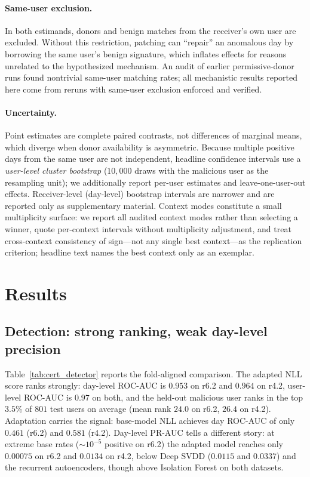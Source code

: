 \documentclass[10pt]{article} %
\newcommand{\rsix}{r6.2}
\newcommand{\rfour}{r4.2}
\begin{document}
\paragraph{Same-user exclusion.}
In both estimands, donors and benign matches from the receiver's own user are
excluded. Without this restriction, patching can ``repair'' an anomalous day by
borrowing the same user's benign signature, which inflates effects for reasons
unrelated to the hypothesized mechanism. An audit of earlier permissive-donor
runs found nontrivial same-user matching rates; all mechanistic results
reported here come from reruns with same-user exclusion enforced and verified.

\paragraph{Uncertainty.}
Point estimates are complete paired contrasts, not differences of marginal
means, which diverge when donor availability is asymmetric. Because multiple
positive days from the same user are not independent, headline confidence
intervals use a \emph{user-level cluster bootstrap} ($10{,}000$ draws with the
malicious user as the resampling unit); we additionally report per-user
estimates and leave-one-user-out effects. Receiver-level (day-level) bootstrap
intervals are narrower and are reported only as supplementary material.
Context modes constitute a small multiplicity surface: we report all audited
context modes rather than selecting a winner, quote per-context intervals
without multiplicity adjustment, and treat cross-context consistency of
sign---not any single best context---as the replication criterion; headline
text names the best context only as an exemplar.

\section{Results}
\label{sec:results}

\subsection{Detection: strong ranking, weak day-level precision}
\label{sec:detresults}

Table~\ref{tab:cert_detector} reports the fold-aligned comparison. The adapted
NLL score ranks strongly: day-level ROC-AUC is $0.953$ on \rsix{} and $0.964$
on \rfour{}, user-level ROC-AUC is $0.97$ on both, and the held-out malicious
user ranks in the top $3.5\%$ of $801$ test users on average (mean rank $24.0$
on \rsix{}, $26.4$ on \rfour{}). Adaptation carries the signal: base-model NLL
achieves day ROC-AUC of only $0.461$ (\rsix{}) and $0.581$ (\rfour{}).
Day-level PR-AUC tells a different story: at extreme base rates
($\sim$$10^{-5}$ positive on \rsix{}) the adapted model reaches only
$0.00075$ on \rsix{} and $0.0134$ on \rfour{}, below Deep SVDD
($0.0115$ and $0.0337$) and the recurrent autoencoders, though above Isolation
Forest on both datasets.
\end{document}
